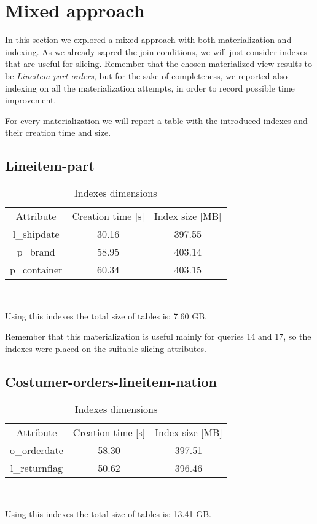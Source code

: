 \section{Mixed approach}
In this section we explored a mixed approach with both materialization and indexing.
As we already sapred the join conditions, we will just consider indexes that are useful for slicing.
Remember that the chosen materialized view results to be \textit{Lineitem-part-orders}, but for the sake of completeness, we reported also indexing on all the materialization attempts, in order to record possible time improvement. 

For every materialization we will report a table with the introduced indexes and their creation time and size.

\subsection{Lineitem-part}

\begin{table}[H]
\centering
\begin{tabular}{c|c|c}
\rowcolor{blue!50}  Attribute     & Creation time [s] & Index size [MB]\\
\rowcolor{gray!10} l\_shipdate     & 30.16          & 397.55 \\ 
\rowcolor{white}   p\_brand        & 58.95          & 403.14 \\
\rowcolor{gray!10} p\_container    & 60.34          & 403.15 \\ 
\end{tabular}\\[0.5cm]
    \caption{Indexes dimensions}
\end{table}
Using this indexes the total size of tables is: 7.60 GB.

Remember that this materialization is useful mainly for queries 14 and 17, so the indexes were placed on the suitable slicing attributes.

\subsection{Costumer-orders-lineitem-nation}

\begin{table}[H]
\centering
\begin{tabular}{c|c|c}
\rowcolor{blue!50}  Attribute     & Creation time [s] & Index size [MB]\\
\rowcolor{gray!10} o\_orderdate     & 58.30       & 397.51 \\ 
\rowcolor{white}   l\_returnflag    & 50.62       & 396.46 \\
\end{tabular}\\[0.5cm]
    \caption{Indexes dimensions}
\end{table}
Using this indexes the total size of tables is: 13.41 GB.

